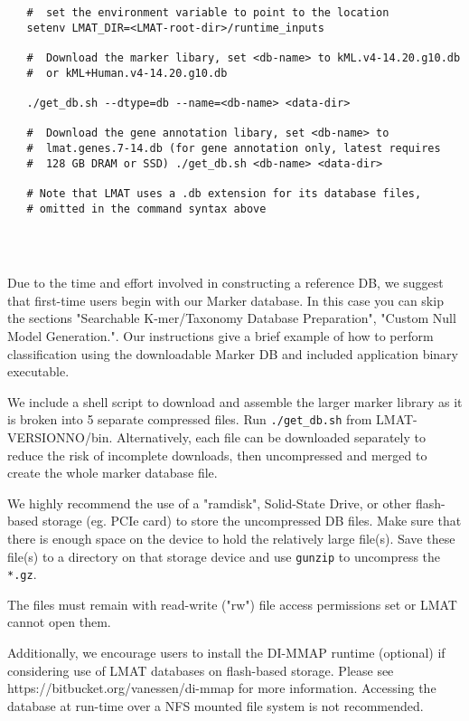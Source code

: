 \documentclass[11pt]{article}
\newcommand{\lmatver}{VERSIONNO}
\begin{document}
\begin{enumerate}[A.]
{\begin{verbatim}
   #  set the environment variable to point to the location
   setenv LMAT_DIR=<LMAT-root-dir>/runtime_inputs

   #  Download the marker libary, set <db-name> to kML.v4-14.20.g10.db 
   #  or kML+Human.v4-14.20.g10.db

   ./get_db.sh --dtype=db --name=<db-name> <data-dir>

   #  Download the gene annotation libary, set <db-name> to
   #  lmat.genes.7-14.db (for gene annotation only, latest requires
   #  128 GB DRAM or SSD) ./get_db.sh <db-name> <data-dir>

   # Note that LMAT uses a .db extension for its database files,
   # omitted in the command syntax above




\end{verbatim}     
         
     Due to the time and effort involved in constructing a reference
     DB, we suggest that first-time users begin with our Marker
     database.  In this case you can skip the sections "Searchable
     K-mer/Taxonomy Database Preparation", "Custom Null Model
     Generation.".  Our  instructions give a
     brief example of how to perform classification using the
     downloadable Marker DB and included application binary
     executable.

     We include a shell script to download and assemble the larger
     marker library as it is broken into 5 separate compressed files.
     Run \texttt{./get\_db.sh} from LMAT-\lmatver/bin.
     Alternatively, each file can be downloaded separately to reduce
     the risk of incomplete downloads, then uncompressed and merged to
     create the whole marker database file.
        
     We highly recommend the use of a "ramdisk", Solid-State Drive, or
     other flash-based storage (eg. PCIe card) to store the
     uncompressed DB files.  Make sure that there is enough space on
     the device to hold the relatively large file(s).  Save these
     file(s) to a directory on that storage device and use
     \texttt{gunzip} to uncompress the \texttt{*.gz}.

     The files must remain with read-write ("rw") file access
     permissions set or LMAT cannot open them.

     Additionally, we encourage users to install
     the DI-MMAP runtime (optional) if considering use of LMAT
     databases on flash-based storage.  Please see
     https://bitbucket.org/vanessen/di-mmap for more information.
     Accessing the database at run-time over a NFS mounted file system
     is not recommended.  

}
\end{enumerate}
\end{document}
